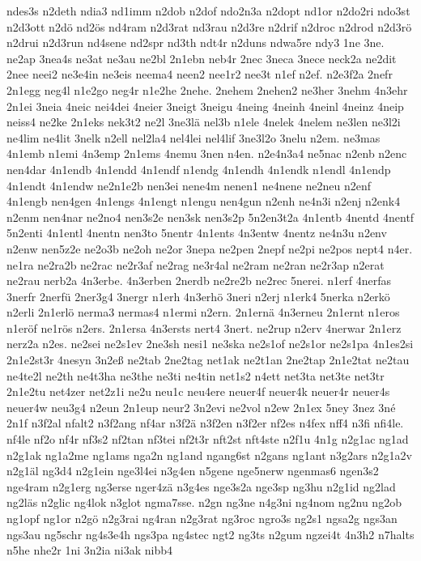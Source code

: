{ndes3s
n2deth
ndia3
nd1imm
n2dob
n2dof
ndo2n3a
n2dopt
nd1or
n2do2ri
ndo3st
n2d3ott
n2dö
nd2ös
nd4ram
n2d3rat
nd3rau
n2d3re
n2drif
n2droc
n2drod
n2d3rö
n2drui
n2d3run
nd4sene
nd2spr
nd3th
ndt4r
n2duns
ndwa5re
ndy3
1ne
3ne.
ne2ap
3nea4s
ne3at
ne3au
ne2bl
2n1ebn
neb4r
2nec
3neca
3nece
neck2a
ne2dit
2nee
neei2
ne3e4in
ne3eis
neema4
neen2
nee1r2
nee3t
n1ef
n2ef.
n2e3f2a
2nefr
2n1egg
neg4l
n1e2go
neg4r
n1e2he
2nehe.
2nehem
2nehen2
ne3her
3nehm
4n3ehr
2n1ei
3neia
4neic
nei4dei
4neier
3neigt
3neigu
4neing
4neinh
4neinl
4neinz
4neip
neiss4
ne2ke
2n1eks
nek3t2
ne2l
3ne3lä
nel3b
n1ele
4nelek
4nelem
ne3len
ne3l2i
ne4lim
ne4lit
3nelk
n2ell
nel2la4
nel4lei
nel4lif
3ne3l2o
3nelu
n2em.
ne3mas
4n1emb
n1emi
4n3emp
2n1ems
4nemu
3nen
n4en.
n2e4n3a4
ne5nac
n2enb
n2enc
nen4dar
4n1endb
4n1endd
4n1endf
n1endg
4n1endh
4n1endk
n1endl
4n1endp
4n1endt
4n1endw
ne2n1e2b
nen3ei
nene4m
nenen1
ne4nene
ne2neu
n2enf
4n1engb
nen4gen
4n1engs
4n1engt
n1engu
nen4gun
n2enh
ne4n3i
n2enj
n2enk4
n2enm
nen4nar
ne2no4
nen3s2e
nen3sk
nen3s2p
5n2en3t2a
4n1entb
4nentd
4nentf
5n2enti
4n1entl
4nentn
nen3to
5nentr
4n1ents
4n3entw
4nentz
ne4n3u
n2env
n2enw
nen5z2e
ne2o3b
ne2oh
ne2or
3nepa
ne2pen
2nepf
ne2pi
ne2pos
nept4
n4er.
ne1ra
ne2ra2b
ne2rac
ne2r3af
ne2rag
ne3r4al
ne2ram
ne2ran
ne2r3ap
n2erat
ne2rau
nerb2a
4n3erbe.
4n3erben
2nerdb
ne2re2b
ne2rec
5nerei.
n1erf
4nerfas
3nerfr
2nerfü
2ner3g4
3nergr
n1erh
4n3erhö
3neri
n2erj
n1erk4
5nerka
n2erkö
n2erli
2n1erlö
nerma3
nermas4
n1ermi
n2ern.
2n1ernä
4n3erneu
2n1ernt
n1eros
n1eröf
ne1rös
n2ers.
2n1ersa
4n3ersts
nert4
3nert.
ne2rup
n2erv
4nerwar
2n1erz
nerz2a
n2es.
ne2sei
ne2s1ev
2ne3sh
nesi1
ne3ska
ne2s1of
ne2s1or
ne2s1pa
4n1es2si
2n1e2st3r
4nesyn
3n2eß
ne2tab
2ne2tag
net1ak
ne2t1an
2ne2tap
2n1e2tat
ne2tau
ne4te2l
ne2th
ne4t3ha
ne3the
ne3ti
ne4tin
net1s2
n4ett
net3ta
net3te
net3tr
2n1e2tu
net4zer
net2z1i
ne2u
neu1c
neu4ere
neuer4f
neuer4k
neuer4r
neuer4s
neuer4w
neu3g4
n2eun
2n1eup
neur2
3n2evi
ne2vol
n2ew
2n1ex
5ney
3nez
3né
2n1f
n3f2al
nfalt2
n3f2ang
nf4ar
n3f2ä
n3f2en
n3f2er
nf2es
n4fex
nff4
n3fi
nfi4le.
nf4le
nf2o
nf4r
nf3s2
nf2tan
nf3tei
nf2t3r
nft2st
nft4ste
n2f1u
4n1g
n2g1ac
ng1ad
n2g1ak
ng1a2me
ng1ams
nga2n
ng1and
ngang6st
n2gans
ng1ant
n3g2ars
n2g1a2v
n2g1äl
ng3d4
n2g1ein
nge3l4ei
n3g4en
n5gene
nge5nerw
ngenmas6
ngen3s2
nge4ram
n2g1erg
ng3erse
nger4zä
n3g4es
nge3s2a
nge3sp
ng3hu
n2g1id
ng2lad
ng2läs
n2glic
ng4lok
n3glot
ngma7sse.
n2gn
ng3ne
n4g3ni
ng4nom
ng2nu
ng2ob
ng1opf
ng1or
n2gö
n2g3rai
ng4ran
n2g3rat
ng3roc
ngro3s
ng2s1
ngsa2g
ngs3an
ngs3au
ng5schr
ng4s3e4h
ngs3pa
ng4stec
ngt2
ng3ts
n2gum
ngzei4t
4n3h2
n7halts
n5he
nhe2r
1ni
3n2ia
ni3ak
nibb4
}
